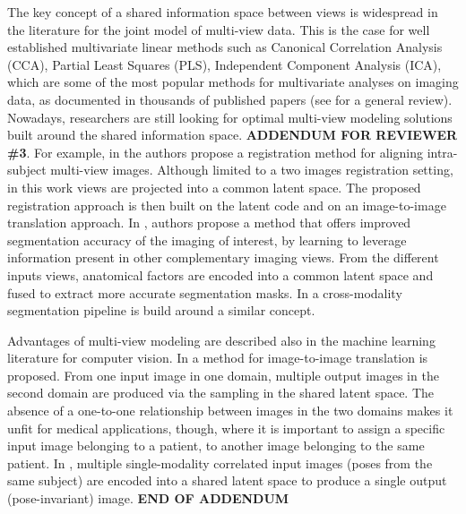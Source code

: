 The key concept of a shared information space between views is widespread in the literature for the joint model of multi-view data.
%
This is the case for well established multivariate linear methods such as
Canonical Correlation Analysis (CCA),
Partial Least Squares (PLS),
Independent Component Analysis (ICA),
which are some of the most popular methods for multivariate analyses on imaging data, as documented in thousands of published papers (see \cite{Liu2014} for a general review).
%
Nowadays, researchers are still looking for optimal multi-view modeling solutions built around the shared information space.
\textbf{ADDENDUM FOR REVIEWER \#3}.
For example, in \cite{Qin2019} the authors propose
a registration method for aligning intra-subject multi-view images.
Although limited to a two images registration setting,
in this work views are projected into a common latent space.
The proposed registration approach is then built on the latent code and on an image-to-image translation approach.
%
%
In \cite{Chartsias2021}, authors propose
a method that offers improved segmentation accuracy of the imaging of interest, by learning to leverage information present in other complementary imaging views.
From the different inputs views, anatomical factors are encoded into a common latent space and fused to extract more accurate segmentation masks.
%
%
In \cite{Yang2020} a cross-modality segmentation pipeline is build around a similar concept.

Advantages of multi-view modeling are described also in the machine learning literature for computer vision.
%
In \cite{Huang2018}
a method for image-to-image translation is proposed.
From one input image in one domain, multiple output images in the second domain are produced via the sampling in the shared latent space.
The absence of a one-to-one relationship between images in the two domains makes it unfit for medical applications, though,
where it is important to assign a specific input image belonging to a patient, to another image belonging to the same patient.
In \cite{Tran2017},
multiple single-modality correlated input images (poses from the same subject) are encoded into a shared latent space to produce a single output (pose-invariant) image.
\textbf{END OF ADDENDUM} \\

